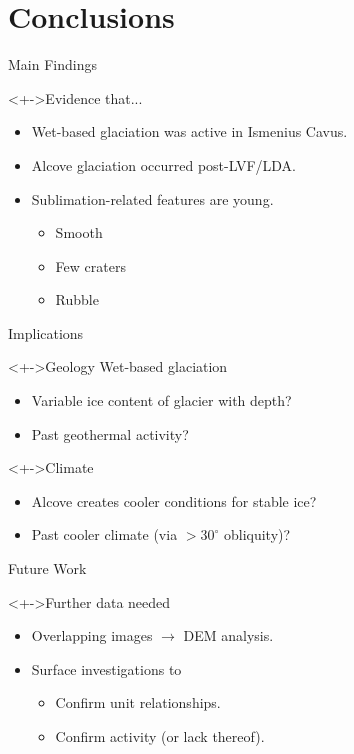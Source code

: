 \section{Conclusions}

\begin{frame}{Main Findings}
    \begin{block}<+->{Evidence that...}
        \begin{itemize}
            \item<+-> Wet-based glaciation was active in Ismenius Cavus.
            \item<+-> Alcove glaciation occurred post-LVF/LDA.
            \item<+-> Sublimation-related features are young.
            \begin{itemize}
                \item Smooth
                \item Few craters
                \item Rubble
            \end{itemize}
        \end{itemize}
    \end{block}
\end{frame}
\begin{frame}{Implications}
    \begin{block}<+->{Geology}
        Wet-based glaciation
        \begin{itemize}
            \item Variable ice content of glacier with depth?
            \item Past geothermal activity?
        \end{itemize}
    \end{block}
    \begin{block}<+->{Climate}
        \begin{itemize}
            \item Alcove creates cooler conditions for stable ice?
            \item Past cooler climate (via $>30^{\circ}$ obliquity)?
        \end{itemize}
    \end{block}
\end{frame}

\begin{frame}{Future Work}
    \begin{block}<+->{Further data needed}
        \begin{itemize}
            \item<+-> Overlapping images $\rightarrow$ DEM analysis.
            \item<+-> Surface investigations to
            \begin{itemize}
                \item Confirm unit relationships.
                \item Confirm activity (or lack thereof).
            \end{itemize}
        \end{itemize}
    \end{block}
\end{frame}